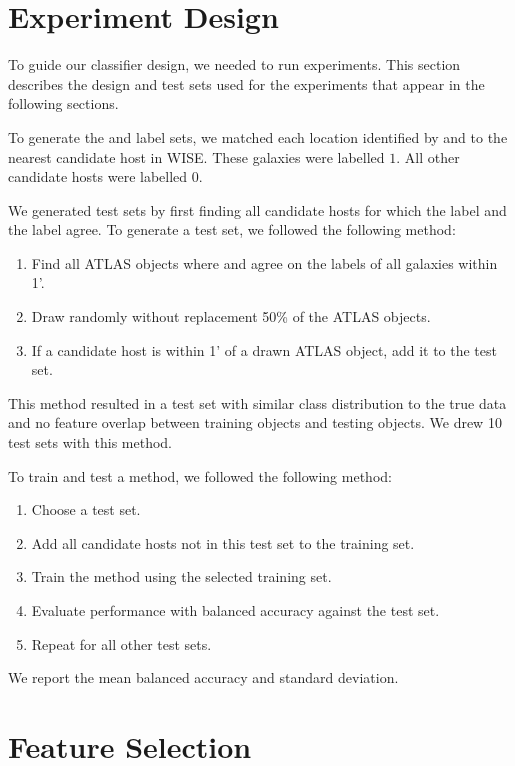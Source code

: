 \section{Experiment Design}
\label{sec:experiment-design}

  To guide our classifier design, we needed to run experiments. This section
  describes the design and test sets used for the experiments that appear in the
  following sections.

  To generate the \citeauthor{norris06} and \citeauthor{fan15} label sets, we
  matched each location identified by \citeauthor{norris06} and
  \citeauthor{fan15} to the nearest candidate host in WISE. These galaxies were
  labelled $1$. All other candidate hosts were labelled $0$.

  We generated test sets by first finding all candidate hosts for which the
  \citeauthor{norris06} label and the \citeauthor{fan15} label agree. To
  generate a test set, we followed the following method:
  \begin{enumerate}
    \item Find all ATLAS objects where \citeauthor{norris06} and
    \citeauthor{fan15} agree on the labels of all galaxies within 1'.
    \item Draw randomly without replacement 50\% of the ATLAS objects.
    \item If a candidate host is within 1' of a drawn ATLAS object, add it to
    the test set.
  \end{enumerate}
  This method resulted in a test set with similar class distribution to the true
  data and no feature overlap between training objects and testing objects. We
  drew 10 test sets with this method.

  To train and test a method, we followed the following method:
  \begin{enumerate}
    \item Choose a test set.
    \item Add all candidate hosts not in this test set to the training set.
    \item Train the method using the selected training set.
    \item Evaluate performance with balanced accuracy against the test set.
    \item Repeat for all other test sets.
  \end{enumerate}
  We report the mean balanced accuracy and standard deviation.

\section{Feature Selection}
\label{sec:features}


